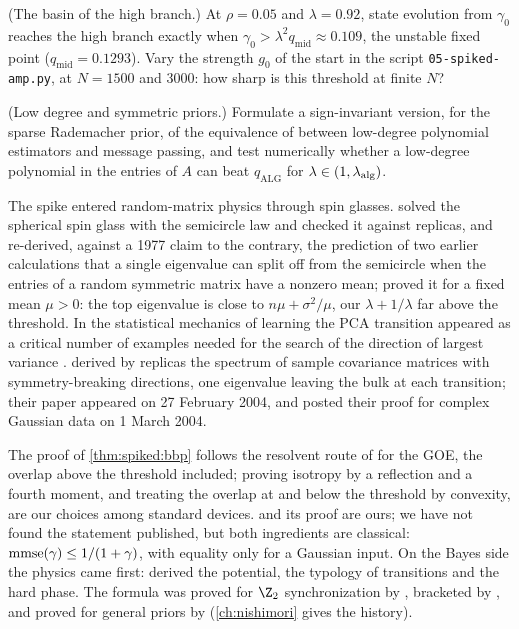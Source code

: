 \begin{refsection}
\begin{exercises}
\item \measurement (The basin of the high branch.) At $\rho=0.05$ and $\lambda=0.92$, state evolution from $\gamma_0$ reaches the high branch exactly when $\gamma_0>\lambda^2q_{\mathrm{mid}}\approx0.109$, the unstable fixed point ($q_{\mathrm{mid}}=0.1293$). Vary the strength $g_0$ of the start in the script \texttt{05-spiked-amp.py}, at $N=1500$ and $3000$: how sharp is this threshold at finite $N$?\label{ex:spiked:basin}

\item \research (Low degree and symmetric priors.) Formulate a sign-invariant version, for the sparse Rademacher prior, of the equivalence of \textcite{MontanariWein2025} between low-degree polynomial estimators and message passing, and test numerically whether a low-degree polynomial in the entries of $A$ can beat $q_{\mathrm{ALG}}$ for $\lambda\in(1,\lambda_{\mathrm{alg}})$.\label{ex:spiked:lowdegree}
\end{exercises}

\notesandrefs
The spike entered random-matrix physics through spin glasses. \Textcite{KosterlitzThoulessJones1976} solved the spherical spin glass with the semicircle law and checked it against replicas, and \textcite{JonesKosterlitzThouless1978} re-derived, against a 1977 claim to the contrary, the prediction of two earlier calculations that a single eigenvalue can split off from the semicircle when the entries of a random symmetric matrix have a nonzero mean; \textcite{FurediKomlos1981} proved it for a fixed mean $\mu>0$: the top eigenvalue is close to $n\mu+\sigma^2/\mu$, our $\lambda+1/\lambda$ far above the threshold. In the statistical mechanics of learning the PCA transition appeared as a critical number of examples needed for the search of the direction of largest variance \parencite{BiehlMietzner1994}. \Textcite{HoyleRattray2004} derived by replicas the spectrum of sample covariance matrices with symmetry-breaking directions, one eigenvalue leaving the bulk at each transition; their paper appeared on 27 February 2004, and \textcite{BaikBenArousPeche2005} posted their proof for complex Gaussian data on 1 March 2004.

The proof of \cref{thm:spiked:bbp} follows the resolvent route of \textcite{BenaychGeorgesNadakuditi2011} for the GOE, the overlap above the threshold included; proving isotropy by a reflection and a fourth moment, and treating the overlap at and below the threshold by convexity, are our choices among standard devices.  and its proof are ours; we have not found the statement published, but both ingredients are classical: $\mathrm{mmse}(\gamma)\le1/(1+\gamma)$, with equality only for a Gaussian input. On the Bayes side the physics came first: \textcite{LesieurKrzakalaZdeborova2017} derived the potential, the typology of transitions and the hard phase. The formula was proved for $\Z_2$ synchronization by \textcite{DeshpandeAbbeMontanari2016}, bracketed by \textcite{KrzakalaXuZdeborova2016}, and proved for general priors by \textcite{LelargeMiolane2019} (\cref{ch:nishimori} gives the history).


\end{refsection}
